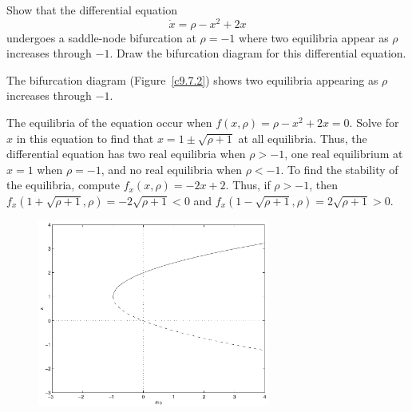 \documentclass{ximera}
\begin{document}
\begin{exercise} \label{c9.7.2}
Show that the differential equation
\[
\dot{x} = \rho - x^2 + 2x
\]
undergoes a saddle-node bifurcation at $\rho=-1$ where two equilibria
appear as $\rho$ increases through $-1$.  Draw the bifurcation diagram
for this differential equation.

\begin{solution}

\ans The bifurcation diagram (Figure~\ref{c9.7.2}) shows two equilibria
appearing as $\rho$ increases through $-1$.

\soln The equilibria of the equation occur when $f(x,\rho) = \rho - x^2 +
2x = 0$.  Solve for $x$ in this equation to find that $x = 1 \pm
\sqrt{\rho + 1}$ at all equilibria.  Thus, the differential equation has
two real equilibria when $\rho > -1$, one real equilibrium at $x = 1$ when
$\rho = -1$, and no real equilibria when $\rho < -1$.  To find the
stability of the equilibria, compute $f_x(x,\rho) = -2x + 2$.  Thus, if
$\rho > -1$, then
$f_x(1 + \sqrt{\rho + 1},\rho) = -2\sqrt{\rho + 1} < 0$ and
$f_x(1 - \sqrt{\rho + 1},\rho) = 2\sqrt{\rho + 1} > 0$.

\begin{figure}[htb]
                       \centerline{%
                       \includegraphics[width=3.0in]{exfigure/9-7-2.pdf}}
\end{figure}

\end{solution}
\end{exercise}
\end{document}
